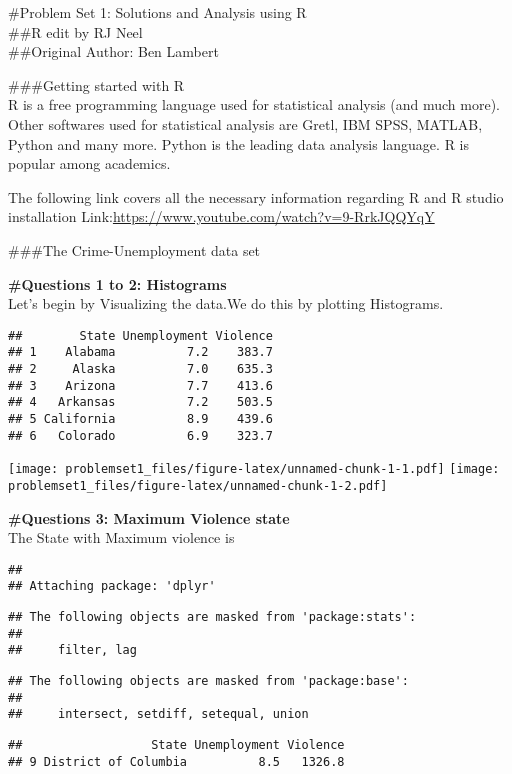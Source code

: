 \documentclass[
]{article}
\author{}
\date{\vspace{-2.5em}}
\begin{document}
\#Problem Set 1: Solutions and Analysis using R\\
\#\#R edit by RJ Neel\\
\#\#Original Author: Ben Lambert

\#\#\#Getting started with R\\
R is a free programming language used for statistical analysis (and much
more). Other softwares used for statistical analysis are Gretl, IBM
SPSS, MATLAB, Python and many more. Python is the leading data analysis
language. R is popular among academics.

The following link covers all the necessary information regarding R and
R studio installation
Link:\url{https://www.youtube.com/watch?v=9-RrkJQQYqY}

\#\#\#The Crime-Unemployment data set

\textbf{\#Questions 1 to 2: Histograms}\\
Let's begin by Visualizing the data.We do this by plotting Histograms.

\begin{verbatim}
##        State Unemployment Violence
## 1    Alabama          7.2    383.7
## 2     Alaska          7.0    635.3
## 3    Arizona          7.7    413.6
## 4   Arkansas          7.2    503.5
## 5 California          8.9    439.6
## 6   Colorado          6.9    323.7
\end{verbatim}

\texttt{[image: problemset1\_files/figure-latex/unnamed-chunk-1-1.pdf]}
\texttt{[image: problemset1\_files/figure-latex/unnamed-chunk-1-2.pdf]}

\textbf{\#Questions 3: Maximum Violence state}\\
The State with Maximum violence is

\begin{verbatim}
## 
## Attaching package: 'dplyr'
\end{verbatim}

\begin{verbatim}
## The following objects are masked from 'package:stats':
## 
##     filter, lag
\end{verbatim}

\begin{verbatim}
## The following objects are masked from 'package:base':
## 
##     intersect, setdiff, setequal, union
\end{verbatim}

\begin{verbatim}
##                  State Unemployment Violence
## 9 District of Columbia          8.5   1326.8
\end{verbatim}
\end{document}
